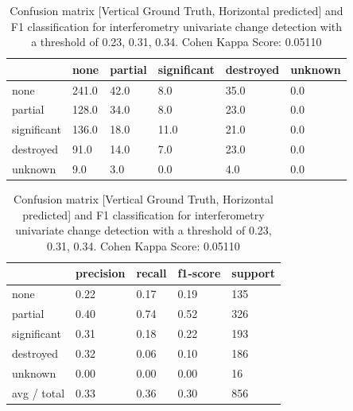 \begin{table} [H]
	\footnotesize
	\captionsetup{justification=raggedright,singlelinecheck=false}
	\caption{Confusion matrix [Vertical Ground Truth, Horizontal predicted] and F1 classification for interferometry univariate change detection with a threshold of 0.23, 0.31, 0.34. Cohen Kappa Score: 0.05110}
	\begin{tabular}{l|lllll}
            & none  & partial & significant & destroyed & unknown \\\hline
none        & 241.0 & 42.0    & 8.0         & 35.0      & 0.0     \\
partial     & 128.0 & 34.0    & 8.0         & 23.0      & 0.0     \\
significant & 136.0 & 18.0    & 11.0        & 21.0      & 0.0     \\
destroyed   & 91.0  & 14.0    & 7.0         & 23.0      & 0.0     \\
unknown     & 9.0   & 3.0     & 0.0         & 4.0       & 0.0    
	\end{tabular}
	\begin{tabular}{l|llll}
            & precision & recall & f1-score & support \\\hline
none        & 0.22      & 0.17   & 0.19     & 135     \\
partial     & 0.40      & 0.74   & 0.52     & 326     \\
significant & 0.31      & 0.18   & 0.22     & 193     \\
destroyed   & 0.32      & 0.06   & 0.10     & 186     \\
unknown     & 0.00      & 0.00   & 0.00     & 16      \\
avg / total & 0.33      & 0.36   & 0.30     & 856   
	\end{tabular}
	
	\label{tab:matInt2}
\end{table} 

